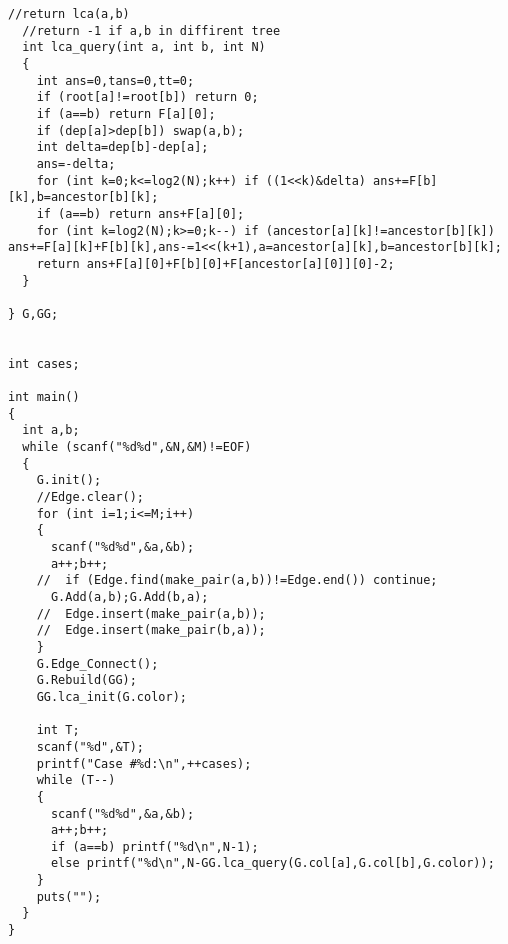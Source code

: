 \begin{lstlisting}[language={}]
  //return lca(a,b)
  //return -1 if a,b in diffirent tree
  int lca_query(int a, int b, int N)
  {
    int ans=0,tans=0,tt=0;
    if (root[a]!=root[b]) return 0;
    if (a==b) return F[a][0];
    if (dep[a]>dep[b]) swap(a,b);
    int delta=dep[b]-dep[a];
    ans=-delta;
    for (int k=0;k<=log2(N);k++) if ((1<<k)&delta) ans+=F[b][k],b=ancestor[b][k];
    if (a==b) return ans+F[a][0];
    for (int k=log2(N);k>=0;k--) if (ancestor[a][k]!=ancestor[b][k]) ans+=F[a][k]+F[b][k],ans-=1<<(k+1),a=ancestor[a][k],b=ancestor[b][k];
    return ans+F[a][0]+F[b][0]+F[ancestor[a][0]][0]-2;
  }

} G,GG;
  

int cases;
  
int main()
{
  int a,b;
  while (scanf("%d%d",&N,&M)!=EOF)
  {
    G.init();
    //Edge.clear();
    for (int i=1;i<=M;i++)
    {
      scanf("%d%d",&a,&b);
      a++;b++;
    //  if (Edge.find(make_pair(a,b))!=Edge.end()) continue;
      G.Add(a,b);G.Add(b,a);
    //  Edge.insert(make_pair(a,b));
    //  Edge.insert(make_pair(b,a));
    }
    G.Edge_Connect();
    G.Rebuild(GG);
    GG.lca_init(G.color);

    int T;
    scanf("%d",&T);
    printf("Case #%d:\n",++cases);
    while (T--)
    {
      scanf("%d%d",&a,&b);
      a++;b++;
      if (a==b) printf("%d\n",N-1);
      else printf("%d\n",N-GG.lca_query(G.col[a],G.col[b],G.color));
    }
    puts("");
  }
}
\end{lstlisting}

